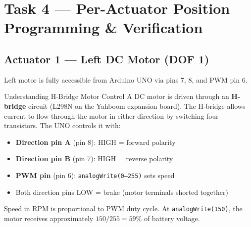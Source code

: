 \documentclass[12pt,a4paper]{article}
\begin{document}
\newpage
\section{Task 4 --- Per-Actuator Position Programming \& Verification}


\subsection{Actuator 1 --- Left DC Motor (DOF 1)}

\begin{donebox}{}
Left motor is fully accessible from Arduino UNO via pins 7, 8, and PWM pin 6.
\end{donebox}

\begin{conceptbox}{Understanding H-Bridge Motor Control}
A DC motor is driven through an \textbf{H-bridge} circuit (L298N on the
Yahboom expansion board). The H-bridge allows current to flow through the motor
in either direction by switching four transistors. The UNO controls it with:

\begin{itemize}[leftmargin=1.5em]
  \item \textbf{Direction pin A} (pin 8): HIGH = forward polarity
  \item \textbf{Direction pin B} (pin 7): HIGH = reverse polarity
  \item \textbf{PWM pin} (pin 6): \texttt{analogWrite(0--255)} sets speed
  \item Both direction pins LOW = brake (motor terminals shorted together)
\end{itemize}

Speed in RPM is proportional to PWM duty cycle. At \texttt{analogWrite(150)},
the motor receives approximately $150/255 = 59\%$ of battery voltage.
\end{conceptbox}
\end{document}
